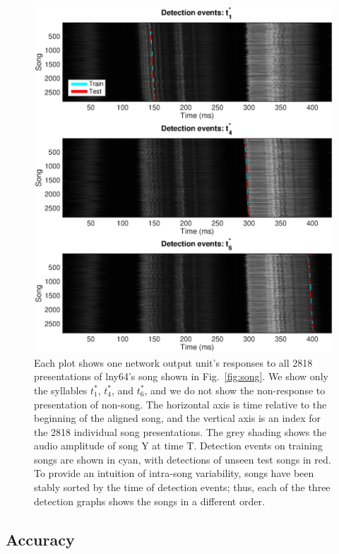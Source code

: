 \documentclass[10pt,letterpaper]{article}
\newcommand\fig[1]{Fig.~\ref{#1}}
\begin{document}
\begin{figure}
  \includegraphics[width=\textwidth]{Fig2}
  \caption{Each plot shows one network output unit's responses to all
    2818 presentations of lny64's song shown in \fig{fig:song}.  We
    show only the syllables $t^*_1$, $t^*_4$, and $t^*_6$, and we do
    not show the non-response to presentation of non-song. The
    horizontal axis is time relative to the beginning of the aligned
    song, and the vertical axis is an index for the 2818 individual
    song presentations. The grey shading shows the audio amplitude of
    song Y at time T. Detection events on training songs are shown in
    cyan, with detections of unseen test songs in red.  To provide an
    intuition of intra-song variability, songs have been stably sorted
    by the time of detection events; thus, each of the three detection
    graphs shows the songs in a different order.}
  \label{fig:detection_raster}
\end{figure}

\subsection{Accuracy}
\end{document}
